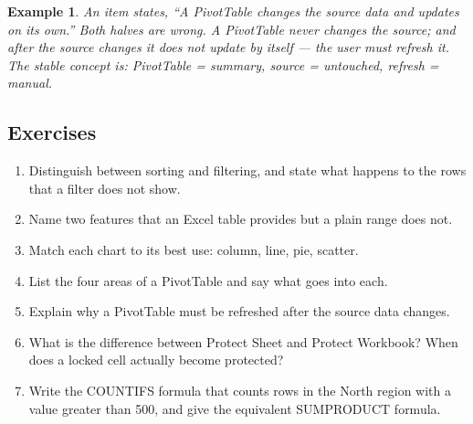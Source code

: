 \documentclass[11pt]{article}
\newtheorem{example}{Example}[section]
\begin{document}
\begin{example}
An item states, ``A PivotTable changes the source data and updates on its own.''
Both halves are wrong. A PivotTable never changes the source; and after the
source changes it does not update by itself --- the user must refresh it. The
stable concept is: PivotTable = summary, source = untouched, refresh = manual.
\end{example}

\subsection*{Exercises}
\begin{enumerate}[label=\arabic*.]
  \item Distinguish between sorting and filtering, and state what happens to the
    rows that a filter does not show.
  \item Name two features that an Excel table provides but a plain range does
    not.
  \item Match each chart to its best use: column, line, pie, scatter.
  \item List the four areas of a PivotTable and say what goes into each.
  \item Explain why a PivotTable must be refreshed after the source data
    changes.
  \item What is the difference between Protect Sheet and Protect Workbook?
    When does a locked cell actually become protected?
  \item Write the COUNTIFS formula that counts rows in the North region with a
    value greater than 500, and give the equivalent SUMPRODUCT formula.
\end{enumerate}
\end{document}
